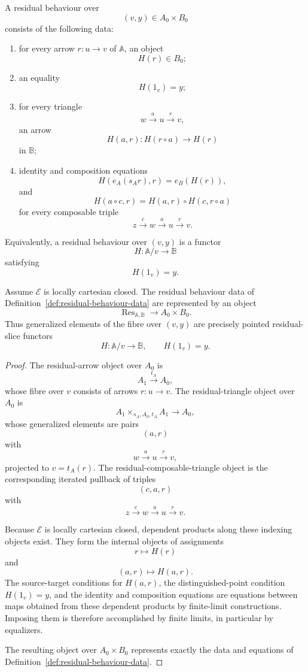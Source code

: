 \begin{definition}
\label{def:residual-behaviour-data}
A residual behaviour over
\[
(v,y)\in A_0\times B_0
\]
consists of the following data:
\begin{enumerate}
\item for every arrow \(r:u\to v\) of \(\mathbb A\), an object
\[
H(r)\in B_0;
\]
\item an equality
\[
H(1_v)=y;
\]
\item for every triangle
\[
w\xrightarrow{a}u\xrightarrow{r}v,
\]
an arrow
\[
H(a,r):H(r\circ a)\to H(r)
\]
in \(\mathbb B\);
\item identity and composition equations
\[
H(e_A(s_A r),r)=e_B(H(r)),
\]
and
\[
H(a\circ c,r)
=
H(a,r)\circ H(c,r\circ a)
\]
for every composable triple
\[
z\xrightarrow{c}w\xrightarrow{a}u\xrightarrow{r}v.
\]
\end{enumerate}
Equivalently, a residual behaviour over \((v,y)\) is a functor
\[
H:\mathbb A/v\to\mathbb B
\]
satisfying
\[
H(1_v)=y.
\]
\end{definition}

\begin{proposition}
\label{prop:residual-behaviour-object-exists}
Assume \(\mathcal E\) is locally cartesian closed. The residual behaviour data
of Definition~\ref{def:residual-behaviour-data} are represented by an object
\[
\operatorname{Res}_{\mathbb A,\mathbb B}\to A_0\times B_0.
\]
Thus generalized elements of the fibre over \((v,y)\) are precisely pointed
residual-slice functors
\[
H:\mathbb A/v\to\mathbb B,
\qquad
H(1_v)=y.
\]
\end{proposition}

\begin{proof}
The residual-arrow object over \(A_0\) is
\[
A_1\xrightarrow{t_A}A_0,
\]
whose fibre over \(v\) consists of arrows \(r:u\to v\). The residual-triangle
object over \(A_0\) is
\[
A_1\times_{s_A,A_0,t_A}A_1
\longrightarrow A_0,
\]
whose generalized elements are pairs
\[
(a,r)
\]
with
\[
w\xrightarrow{a}u\xrightarrow{r}v,
\]
projected to \(v=t_A(r)\). The residual-composable-triangle object is the
corresponding iterated pullback of triples
\[
(c,a,r)
\]
with
\[
z\xrightarrow{c}w\xrightarrow{a}u\xrightarrow{r}v.
\]

Because \(\mathcal E\) is locally cartesian closed, dependent products along
these indexing objects exist. They form the internal objects of assignments
\[
r\longmapsto H(r)
\]
and
\[
(a,r)\longmapsto H(a,r).
\]
The source-target conditions for \(H(a,r)\), the distinguished-point condition
\(H(1_v)=y\), and the identity and composition equations are equations between
maps obtained from these dependent products by finite-limit constructions.
Imposing them is therefore accomplished by finite limits, in particular by
equalizers.

The resulting object over \(A_0\times B_0\) represents exactly the data and
equations of Definition~\ref{def:residual-behaviour-data}.
\end{proof}

